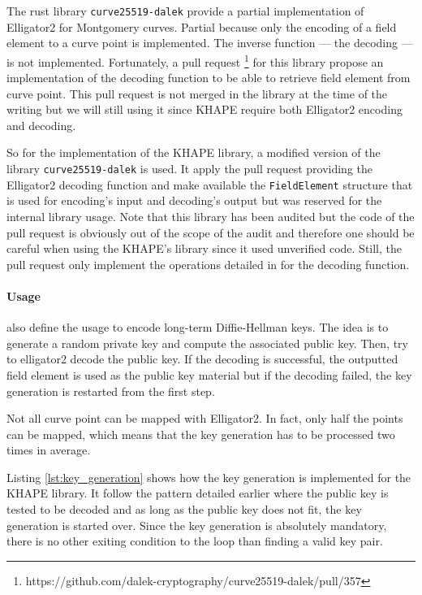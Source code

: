 \documentclass[../report.tex]{subfiles}
\begin{document}
The rust library \verb|curve25519-dalek| provide a partial implementation of Elligator2 for Montgomery curves. Partial because only the encoding of a field element to a curve point is implemented. The inverse function --- the decoding --- is not implemented. 
Fortunately, a pull request \footnote{https://github.com/dalek-cryptography/curve25519-dalek/pull/357} for this library propose an implementation of the decoding function to be able to retrieve field element from curve point. This pull request is not merged in the library at the time of the writing but we will still using it since KHAPE require both Elligator2 encoding and decoding. 

So for the implementation of the KHAPE library, a modified version of the library \verb|curve25519-dalek| is used. It apply the pull request providing the Elligator2 decoding function and make available the \verb|FieldElement| structure that is used for encoding's input and decoding's output but was reserved for the internal library usage. 
Note that this library has been audited \cite{Curve25519_Dalek_Audit} but the code of the pull request is obviously out of the scope of the audit and therefore one should be careful when using the KHAPE's library since it used unverified code. Still, the pull request only implement the operations detailed in \cite{Elligator2_Paper} for the decoding function.


\paragraph{Usage}

\cite{Elligator2_Paper} also define the usage to encode long-term Diffie-Hellman keys. 
The idea is to generate a random private key and compute the associated public key. Then, try to elligator2 decode the public key. 
If the decoding is successful, the outputted field element is used as the public key material but if the decoding failed, the key generation is restarted from the first step.

Not all curve point can be mapped with Elligator2. 
In fact, only half the points can be mapped, which means that the key generation has to be processed two times in average.

Listing \ref{lst:key_generation} shows how the key generation is implemented for the KHAPE library. It follow the pattern detailed earlier where the public key is tested to be decoded and as long as the public key does not fit, the key generation is started over. Since the key generation is absolutely mandatory, there is no other exiting condition to the loop than finding a valid key pair.
\end{document}
